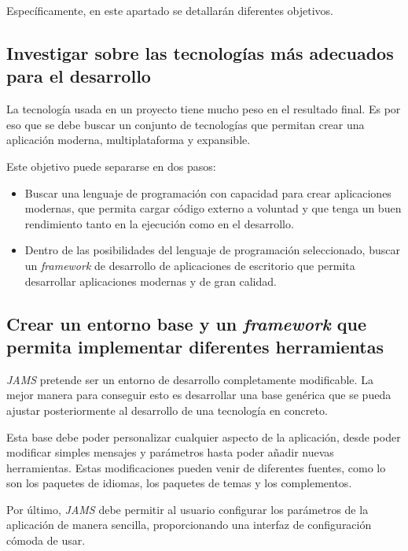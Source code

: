 \noindent Específicamente, en este apartado se detallarán diferentes objetivos.

\subsection{Investigar sobre las tecnologías más adecuados para el desarrollo}
\label{subsec:investigar-sobre-las-tecnologias-mas-adecuados-para-el-desarrollo}

La tecnología usada en un proyecto tiene mucho peso en el resultado final.
Es por eso que se debe buscar un conjunto de tecnologías que permitan crear una aplicación
moderna, multiplataforma y expansible.

\noexpand Este objetivo puede separarse en dos pasos:
\begin{itemize}
    \item Buscar una lenguaje de programación con capacidad para crear aplicaciones modernas,
    que permita cargar código externo a voluntad y que tenga un buen rendimiento
    tanto en la ejecución como en el desarrollo.
    \item Dentro de las posibilidades del lenguaje de programación seleccionado,
    buscar un \textit{framework} de desarrollo de aplicaciones de escritorio
    que permita desarrollar aplicaciones modernas y de gran calidad.
\end{itemize}

\subsection{Crear un entorno base y un \textit{framework} que permita implementar diferentes herramientas}
\label{subsec:crear-un-entorno-base-y-un-framework-que-permita-implementar-diferentes-herramientas}

\textit{JAMS} pretende ser un entorno de desarrollo completamente modificable.
La mejor manera para conseguir esto es desarrollar una base genérica
que se pueda ajustar posteriormente al desarrollo de una tecnología en concreto.

\noindent Esta base debe poder personalizar cualquier aspecto de la aplicación,
desde poder modificar simples mensajes y parámetros hasta poder
añadir nuevas herramientas.
Estas modificaciones pueden venir de diferentes fuentes, como lo son
los paquetes de idiomas, los paquetes de temas y los complementos.

\noindent Por último, \textit{JAMS} debe permitir al usuario configurar los parámetros
de la aplicación de manera sencilla, proporcionando una interfaz de configuración
cómoda de usar.

